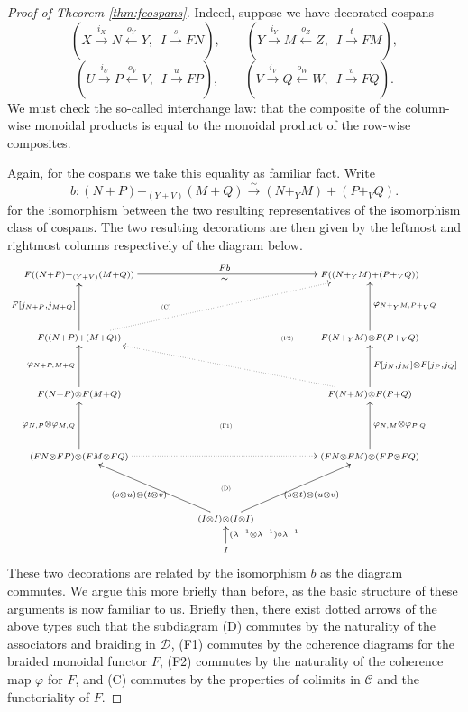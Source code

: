 \begin{proof}[Proof of Theorem \ref{thm:fcospans}]
Indeed, suppose we have decorated cospans
\[
  (X \stackrel{i_X}\longrightarrow N \stackrel{o_Y}\longleftarrow Y,\enspace I
  \stackrel{s}\longrightarrow FN),
  \qquad
  (Y \stackrel{i_Y}\longrightarrow M \stackrel{o_Z}\longleftarrow Z,\enspace I
  \stackrel{t}\longrightarrow FM), 
\]
\[
  (U \stackrel{i_U}\longrightarrow P \stackrel{o_V}\longleftarrow V,\enspace I
  \stackrel{u}\longrightarrow FP),
  \qquad
  (V \stackrel{i_V}\longrightarrow Q \stackrel{o_W}\longleftarrow W,\enspace I
  \stackrel{v}\longrightarrow FQ). 
\]
We must check the so-called interchange law: that the composite of the
column-wise monoidal products is equal to the monoidal product of the row-wise
composites.

Again, for the cospans we take this equality as familiar fact. Write 
\[
  b\colon  (N+P)+_{(Y+V)}(M+Q) \stackrel{\sim}{\longrightarrow} (N+_YM)+(P+_{V}Q).
\]
for the isomorphism between the two resulting representatives of the isomorphism
class of cospans. The two resulting decorations are then given by the leftmost 
and rightmost columns respectively of the diagram below.
\[
  \xymatrixcolsep{1.4pc}
  \xymatrixrowsep{1.2pc}
  \xymatrix{ 
    \scriptstyle F((N+P)+_{(Y+V)}(M+Q)) \ar[rrrr]^{Fb}_{\sim} &&&&
    \scriptstyle F((N+_YM)+(P+_VQ)) \\
    & \textsc{\tiny(C)} \\
    \scriptstyle F((N+P)+(M+Q)) \ar[uu]^{F[j_{N+P},j_{M+Q}]} \ar@{.>}[uurrrr] &&&
    \textsc{\tiny(F2)} & \scriptstyle F(N+_YM)\otimes F(P+_VQ)
    \ar[uu]_{\varphi_{N+_YM,P+_VQ}} \\
    \\
    \scriptstyle F(N+P)\otimes F(M+Q) \ar[uu]^{\varphi_{N+P,M+Q}} &&&&
    \scriptstyle F(N+M)\otimes F(P+Q) \ar@{.>}[uullll]
    \ar[uu]_{F[j_N,j_M] \otimes F[j_P,j_Q]} \\
    && \textsc{\tiny(F1)} \\
    \scriptstyle (FN \otimes FP) \otimes (FM \otimes FQ) \ar[uu]^{\varphi_{N,P} \otimes
    \varphi_{M,Q}} \ar@{.>}[rrrr] &&&& \scriptstyle (FN \otimes FM) \otimes (FP \otimes FQ)
    \ar[uu]_{\varphi_{N,M} \otimes \varphi_{P,Q}} \\
    && \textsc{\tiny(D)} \\
    && \scriptstyle (I\otimes I)\otimes(I\otimes I) \ar[uull]^{(s\otimes u) \otimes (t \otimes
    v)} \ar[uurr]_{(s \otimes t) \otimes (u \otimes v)} \\
    && \scriptstyle I \ar[u]_{(\lambda^{-1}\otimes\lambda^{-1})\circ\lambda^{-1}}
  }
\]
These two decorations are related by the isomorphism $b$ as the diagram
commutes. We argue this more briefly than before, as the basic structure of
these arguments is now familiar to us. Briefly then, there exist dotted arrows
of the above types such that the subdiagram (D) commutes by the naturality of
the associators and braiding in $\mathcal D$, (F1) commutes by the coherence
diagrams for the braided monoidal functor $F$, (F2) commutes by the naturality of
the coherence map $\varphi$ for $F$, and (C) commutes by the properties of
colimits in $\mathcal C$ and the functoriality of $F$. 


\end{proof}
